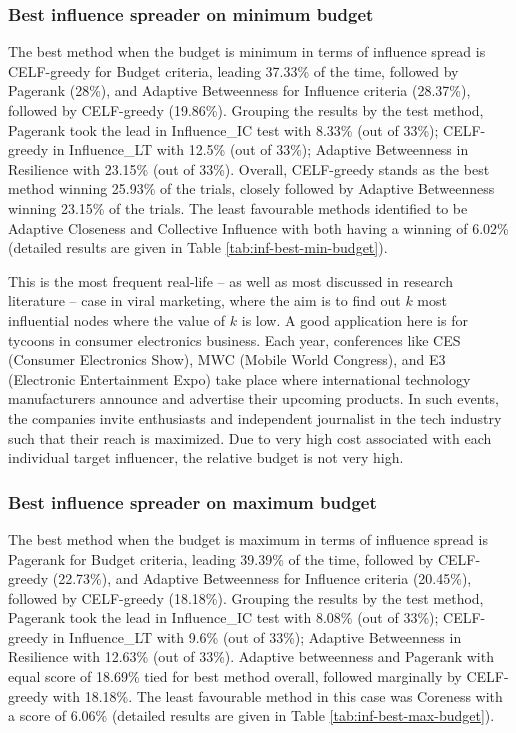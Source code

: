 		\subsubsection{Best influence spreader on minimum budget}
		The best method when the budget is minimum in terms of influence spread is CELF-greedy for Budget criteria, leading 37.33\% of the time, followed by Pagerank (28\%), and Adaptive Betweenness for Influence criteria (28.37\%), followed by CELF-greedy (19.86\%). Grouping the results by the test method, Pagerank took the lead in Influence\_IC test with 8.33\% (out of 33\%); CELF-greedy in Influence\_LT with 12.5\% (out of 33\%); Adaptive Betweenness in Resilience with 23.15\% (out of 33\%). Overall, CELF-greedy stands as the best method winning 25.93\% of the trials, closely followed by Adaptive Betweenness winning 23.15\% of the trials. The least favourable methods identified to be Adaptive Closeness and Collective Influence with both having a winning of 6.02\% (detailed results are given in Table \ref{tab:inf-best-min-budget}).
		
		This is the most frequent real-life -- as well as most discussed in research literature -- case in viral marketing, where the aim is to find out $k$ most influential nodes where the value of $k$ is low. A good application here is for tycoons in consumer electronics business. Each year, conferences like CES (Consumer Electronics Show), MWC (Mobile World Congress), and E3 (Electronic Entertainment Expo) take place where international technology manufacturers announce and advertise their upcoming products. In such events, the companies invite enthusiasts and independent journalist in the tech industry such that their reach is maximized.	Due to very high cost associated with each individual target influencer, the relative budget is not very high.
	
		\subsubsection{Best influence spreader on maximum budget}
		The best method when the budget is maximum in terms of influence spread is Pagerank for Budget criteria, leading 39.39\% of the time, followed by CELF-greedy (22.73\%), and Adaptive Betweenness for Influence criteria (20.45\%), followed by CELF-greedy (18.18\%). Grouping the results by the test method, Pagerank took the lead in Influence\_IC test with 8.08\% (out of 33\%); CELF-greedy in Influence\_LT with 9.6\% (out of 33\%); Adaptive Betweenness in Resilience with 12.63\% (out of 33\%). Adaptive betweenness and Pagerank with equal score of 18.69\% tied for best method overall, followed marginally by CELF-greedy with 18.18\%. The least favourable method in this case was Coreness with a score of 6.06\% (detailed results are given in Table \ref{tab:inf-best-max-budget}).
		
